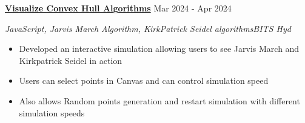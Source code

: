 \documentclass[a4paper,12pt]{report}
\begin{document}
\vspace{3pt}
\noindent 
\textbf{\href{https://glittering-raindrop-a2b317.netlify.app/}{\color{black}Visualize Convex Hull Algorithms}} \hfill  {\fontsize{12pt}{12pt}\selectfont Mar 2024 - Apr 2024} \par
\noindent
{\fontsize{12pt}{12pt}\selectfont \textit{JavaScript, Jarvis March Algorithm, KirkPatrick Seidel algorithms}\hfill\textit{BITS Hyd}} \par
\noindent 
\begin{itemize}[noitemsep,topsep=0pt]
    \item {\fontsize{12pt}{12pt}\selectfont Developed an interactive simulation allowing users to see Jarvis March and Kirkpatrick Seidel in action} \par
    \item {\fontsize{12pt}{12pt}\selectfont Users can select points in Canvas and can control simulation speed} \par
    \item {\fontsize{12pt}{12pt}\selectfont Also allows Random points generation and restart simulation with different simulation speeds} \par
\end{itemize}

 \par
\vspace{9pt}
\end{document}
